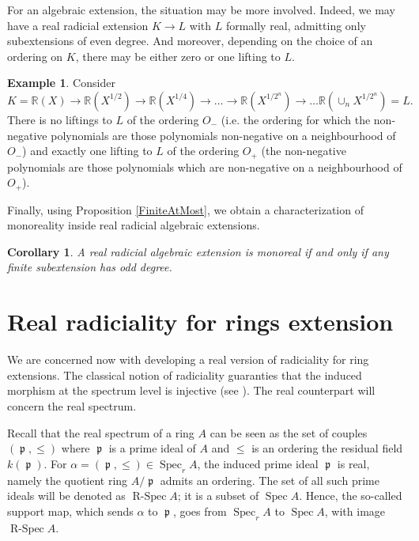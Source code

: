 \documentclass[12pt]{amsart}
\newtheorem{cor}[thm]{Corollary}
\theoremstyle{definition}
\newtheorem{ex}[thm]{Example}
\DeclareMathOperator{\RSp}{R-Spec}
\DeclareMathOperator{\Sp}{Spec}
\DeclareMathOperator{\p}{\mathfrak{p}}
\def \RR {{\mathbb R}}
\begin{document}
For an algebraic extension, the situation may be more involved. Indeed, we may have a real radicial extension $K\to L$  with $L$ formally real, admitting only subextensions of even degree. And moreover, depending on the choice of an ordering on $K$, there may be either zero or one lifting to $L$.

\begin{ex}\label{ex-root}
Consider 
$$K=\RR(X)\to \RR(X^{1/2})\to \RR(X^{1/4})\to\ldots\to \RR(X^{1/2^n})\to\ldots \RR(\cup_nX^{1/2^n})=L.$$ There is no liftings to $L$ of the ordering $O_-$ (i.e. the ordering for which the non-negative polynomials are those polynomials non-negative on a neighbourhood of $O_-$) and exactly one lifting to $L$ of the ordering $O_+$ (the non-negative polynomials are those polynomials which are non-negative on a neighbourhood of $O_+$). 
\end{ex}


Finally, using Proposition \ref{FiniteAtMost}, we obtain a characterization of monoreality inside real radicial algebraic extensions. 

\begin{cor}
A real radicial algebraic extension is monoreal if and only if any finite subextension has odd degree.
\end{cor}










\section{Real  radiciality for rings extension}\label{sec-ring}

We are concerned now with developing a real version of radiciality for ring extensions. The classical notion of radiciality guaranties that the induced morphism at the spectrum level is injective (see \cite{BFMQ}). The real counterpart will concern the real spectrum. 

Recall that the real spectrum of a ring $A$ can be seen as the set of couples $(\p,\leq)$ where $\p$ is a prime ideal of $A$ and $\leq$ is an ordering the residual field 
$k(\p)$. 
For $\alpha=(\p,\leq)\in\Sp_r A$, the induced prime ideal $\p$ is real, namely the quotient ring $A/\p$ admits an ordering. The set of all such prime ideals will be denoted as $\RSp A$; it is a subset of $\Sp A$. Hence, the so-called support map, which sends $\alpha$ to $\p$, goes from $\Sp_r A$ to $\Sp A$, with image $\RSp A$.
\end{document}
